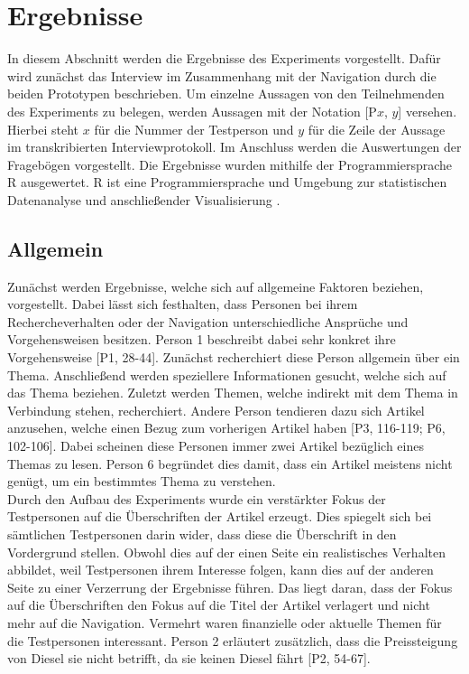 \section{Ergebnisse}\label{sec:results}
In diesem Abschnitt werden die Ergebnisse des Experiments vorgestellt.
Dafür wird zunächst das Interview im Zusammenhang mit der Navigation durch die beiden Prototypen beschrieben.
Um einzelne Aussagen von den Teilnehmenden des Experiments zu belegen, werden Aussagen mit der Notation [P$x$, $y$] versehen.
Hierbei steht $x$ für die Nummer der Testperson und $y$ für die Zeile der Aussage im transkribierten Interviewprotokoll.
Im Anschluss werden die Auswertungen der Fragebögen vorgestellt.
Die Ergebnisse wurden mithilfe der Programmiersprache R ausgewertet.
R ist eine Programmiersprache und Umgebung zur statistischen Datenanalyse und anschließender Visualisierung \cite{rlang}.

\subsection{Allgemein}
Zunächst werden Ergebnisse, welche sich auf allgemeine Faktoren beziehen, vorgestellt.
Dabei lässt sich festhalten, dass Personen bei ihrem Rechercheverhalten oder der Navigation unterschiedliche Ansprüche und Vorgehensweisen besitzen.
Person 1 beschreibt dabei sehr konkret ihre Vorgehensweise [P1, 28-44].
Zunächst recherchiert diese Person allgemein über ein Thema.
Anschließend werden speziellere Informationen gesucht, welche sich auf das Thema beziehen.
Zuletzt werden Themen, welche indirekt mit dem Thema in Verbindung stehen, recherchiert.
Andere Person tendieren dazu sich Artikel anzusehen, welche einen Bezug zum vorherigen Artikel haben [P3, 116-119; P6, 102-106].
Dabei scheinen diese Personen immer zwei Artikel bezüglich eines Themas zu lesen.
Person 6 begründet dies damit, dass ein Artikel meistens nicht genügt, um ein bestimmtes Thema zu verstehen.\\

Durch den Aufbau des Experiments wurde ein verstärkter Fokus der Testpersonen auf die Überschriften der Artikel erzeugt.
Dies spiegelt sich bei sämtlichen Testpersonen darin wider, dass diese die Überschrift in den Vordergrund stellen.
Obwohl dies auf der einen Seite ein realistisches Verhalten abbildet, weil Testpersonen ihrem Interesse folgen, kann dies auf der anderen Seite zu einer Verzerrung der Ergebnisse führen.
Das liegt daran, dass der Fokus auf die Überschriften den Fokus auf die Titel der Artikel verlagert und nicht mehr auf die Navigation.
Vermehrt waren finanzielle oder aktuelle Themen für die Testpersonen interessant.
Person 2 erläutert zusätzlich, dass die Preissteigung von Diesel sie nicht betrifft, da sie keinen Diesel fährt [P2, 54-67].\\

